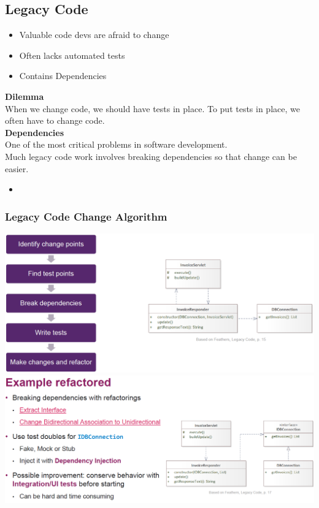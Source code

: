 \subsection{Legacy Code}
\begin{itemize}
    \item Valuable code devs are afraid to change
    \item Often lacks automated tests
    \item Contains Dependencies
\end{itemize}
\textbf{Dilemma}\\
When we change code, we should have tests in place. 
To put tests in place, we often have to change code.\\
\textbf{Dependencies}\\
One of the most critical problems in software development.\\
Much legacy code work involves breaking dependencies so that change can be easier.\\
\begin{itemize}
    \item 
\end{itemize}

\subsubsection{Legacy Code Change Algorithm}
\includegraphics[width=\linewidth]{../img/legacy_code_change_algo.png}
\includegraphics[width=\linewidth]{../img/legacy_code_change_algo_refactored.png}

